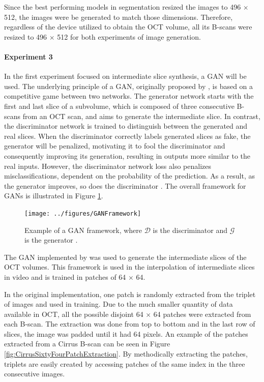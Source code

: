 Since the best performing models in segmentation resized the images to 496 $\times$ 512, the images were be generated to match those dimensions. Therefore, regardless of the device utilized to obtain the OCT volume, all its B-scans were resized to 496 $\times$ 512 for both experiments of image generation.

\paragraph{Experiment 3}
In the first experiment focused on intermediate slice synthesis, a GAN will be used. The underlying principle of a GAN, originally proposed by \textcite{Goodfellow2014}, is based on a competitive game between two networks. The generator network starts with the first and last slice of a subvolume, which is composed of three consecutive B-scans from an OCT scan, and aims to generate the intermediate slice. In contrast, the discriminator network is trained to distinguish between the generated and real slices. When the discriminator correctly labels generated slices as fake, the generator will be penalized, motivating it to fool the discriminator and consequently improving its generation, resulting in outputs more similar to the real inputs. However, the discriminator network loss also penalizes misclassifications, dependent on the probability of the prediction. As a result, as the generator improves, so does the discriminator \parencite{Goodfellow2020}. The overall framework for GANs is illustrated in Figure \ref{fig:GANFramework}.

\begin{figure}[!ht]
	\centering
	\texttt{[image: ../figures/GANFramework]}
	\caption{Example of a GAN framework, where $\mathcal{D}$ is the discriminator and $\mathcal{G}$ is the generator \cite{Creswell2018}.}
	\label{fig:GANFramework}
\end{figure}

The GAN implemented by \textcite{Tran2020} was used to generate the intermediate slices of the OCT volumes. This framework is used in the interpolation of intermediate slices in video and is trained in patches of 64 $\times$ 64.
\par
In the original implementation, one patch is randomly extracted from the triplet of images and used in training. Due to the much smaller quantity of data available in OCT, all the possible disjoint 64 $\times$ 64 patches were extracted from each B-scan. The extraction was done from top to bottom and in the last row of slices, the image was padded until it had 64 pixels. An example of the patches extracted from a Cirrus B-scan can be seen in Figure \ref{fig:CirrusSixtyFourPatchExtraction}. By methodically extracting the patches, triplets are easily created by accessing patches of the same index in the three consecutive images.

